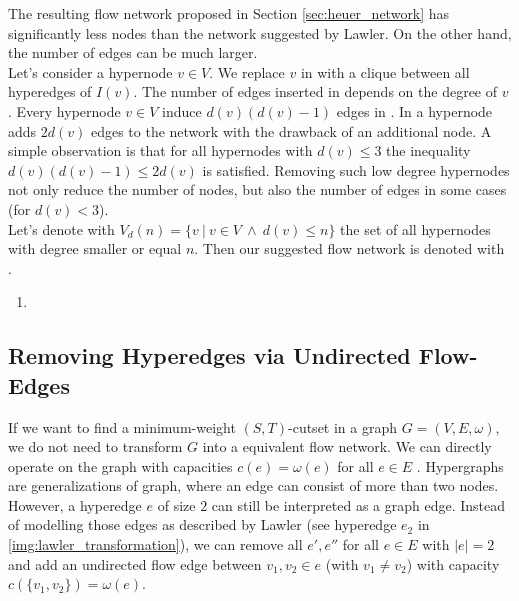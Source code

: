 The resulting flow network  proposed in Section \ref{sec:heuer_network} has significantly
less nodes than the network  suggested by Lawler. On the other hand, the number of
edges can be much larger. \\
Let's consider a hypernode $v \in V$. We replace $v$ in  with a clique between all
hyperedges of $I(v)$. The number of edges inserted in  depends on the degree of
$v$. Every hypernode $v \in V$ induce $d(v)(d(v) - 1)$ edges in . In  a hypernode adds $2d(v)$ edges to the network with the drawback
of an additional node. A simple observation is that for all hypernodes with $d(v) \le 3$ the inequality
$d(v)(d(v) - 1) \le 2d(v)$ is satisfied. Removing such low degree hypernodes not only reduce
the number of nodes, but also the number of edges in some cases (for $d(v) < 3$). \\
Let's denote with $V_{d}(n) = \{v\ |\ v \in V\ \land\ d(v) \le n\}$ the set of all hypernodes
with degree smaller or equal $n$. Then our suggested flow network is denoted with .

\begin{enumerate}
\item {}
\end{enumerate}

\subsection{Removing Hyperedges via Undirected Flow-Edges}
\label{sec:edge_size_network}

If we want to find a minimum-weight $(S,T)$-cutset in a graph $G = (V,E,\omega)$, we do not need to transform
$G$ into a equivalent flow network. We can directly operate on the graph with capacities
$c(e) = \omega(e)$ for all $e \in E$ \cite{ford1956maximal}. Hypergraphs are generalizations of graph, where
an edge can consist of more than two nodes. However, a hyperedge $e$ of size $2$ can still be 
interpreted as a graph edge. Instead of modelling those edges as described by Lawler \cite{lawler1973}
(see hyperedge $e_2$ in \autoref{img:lawler_transformation}), we can remove all $e',e''$ for all $e \in E$
with $|e| = 2$ and add an undirected flow edge between $v_1,v_2 \in e$ (with $v_1 \neq v_2$) with
capacity $c(\{v_1,v_2\}) = \omega(e)$.

